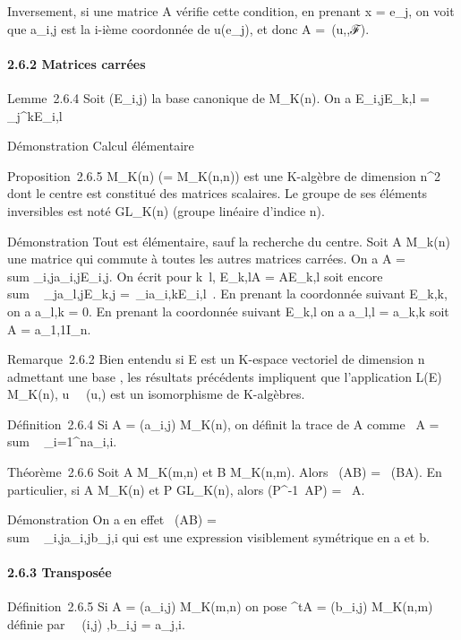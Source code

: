 \documentclass[]{article}
\begin{document}
Inversement, si une matrice A vérifie cette condition, en prenant x =
e_j, on voit que a_i,j est la i-ième coordonnée de
u(e_j), et donc A =\
\mathrmMat (u,,ℱ).

\paragraph{2.6.2 Matrices carrées}

Lemme~2.6.4 Soit (E_i,j) la base canonique de M_K(n).
On a E_i,jE_k,l = \delta_j^kE_i,l

Démonstration Calcul élémentaire

Proposition~2.6.5 M_K(n) (= M_K(n,n)) est une
K-algèbre de dimension n^2 dont le centre est constitué des
matrices scalaires. Le groupe de ses éléments inversibles est noté
GL_K(n) (groupe linéaire d'indice n).

Démonstration Tout est élémentaire, sauf la recherche du centre. Soit A
\in M_k(n) une matrice qui commute à toutes les autres matrices
carrées. On a A =\ \\sum
 _i,ja_i,jE_i,j. On écrit pour
k\neq~l, E_k,lA = AE_k,l soit
encore \\sum ~
_ja_l,jE_k,j =\
\sum  _ia_i,kE_i,l~. En
prenant la coordonnée suivant E_k,k, on a a_l,k = 0.
En prenant la coordonnée suivant E_k,l on a a_l,l =
a_k,k soit A = a_1,1I_n.

Remarque~2.6.2 Bien entendu si E est un K-espace vectoriel de dimension
n admettant une base , les résultats précédents impliquent que
l'application L(E) \rightarrow~ M_K(n),
u\mapsto~\mathrmMat~
(u,\mathcal{E}) est un isomorphisme de K-algèbres.

Définition~2.6.4 Si A = (a_i,j) \in M_K(n), on définit
la trace de A comme
~A
= \\sum ~
_i=1^na_i,i.

Théorème~2.6.6 Soit A \in M_K(m,n) et B \in M_K(n,m).
Alors ~(AB)
= ~(BA). En
particulier, si A \in M_K(n) et P \in GL_K(n), alors
\mathrm{tr}(P^-1~AP)
= \mathrm{tr}~A.

Démonstration On a en effet
~(AB)
= \\sum ~
_i,ja_i,jb_j,i qui est une expression
visiblement symétrique en a et b.

\paragraph{2.6.3 Transposée}

Définition~2.6.5 Si A = (a_i,j) \in M_K(m,n) on pose
^tA = (b_i,j) \in M_K(n,m) définie par
\forall~~(i,j) \in [1,n] \times
[1,m],\quad b_i,j = a_j,i.
\end{document}

